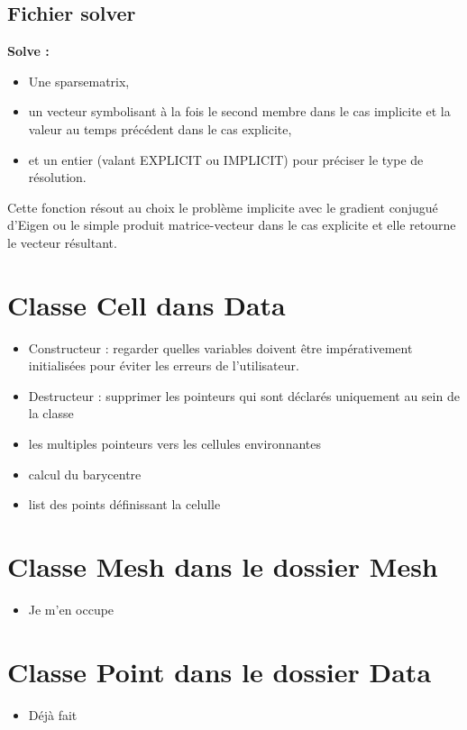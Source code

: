 \documentclass[french]{article}
\newcommand{\elodie}{\hfill{\color{red}{Élodie}}}
\newcommand{\valentin}{\hfill{\color{blue}{Valentin}}}
\begin{document}
\subsection{Fichier solver}

\textbf{Solve :}\elodie
\begin{itemize}
\item Une sparsematrix,
\item un vecteur symbolisant à la fois le second membre dans le cas implicite et la valeur au temps précédent dans le cas explicite,
\item et un entier (valant EXPLICIT ou IMPLICIT) pour préciser le type de résolution.
\end{itemize}
Cette fonction résout au choix le problème implicite avec le gradient conjugué d'Eigen ou le simple produit matrice-vecteur dans le cas explicite et elle retourne le vecteur résultant.


\section{Classe Cell dans Data }
\begin{itemize}
\item Constructeur : regarder quelles variables doivent être impérativement initialisées pour éviter les erreurs de l'utilisateur.
\item Destructeur : supprimer les pointeurs qui sont déclarés uniquement au sein de la classe
\item les multiples pointeurs vers les cellules environnantes \valentin
\item calcul du barycentre \valentin
\item list des points définissant la celulle \valentin
\end{itemize}


\section{Classe Mesh dans le dossier Mesh }
\begin{itemize}
\item Je m'en occupe
\end{itemize}

\section{Classe Point dans le dossier Data }
\begin{itemize}
\item Déjà fait
\end{itemize}
\end{document}

